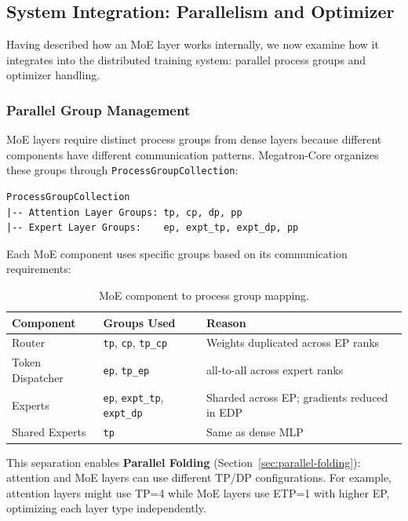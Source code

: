 \subsection{System Integration: Parallelism and Optimizer}\label{sec:moe-system-integration}

Having described how an MoE layer works internally, we now examine how it integrates into the distributed training system: parallel process groups and optimizer handling.

\subsubsection{Parallel Group Management}

MoE layers require distinct process groups from dense layers because different components have different communication patterns. Megatron-Core organizes these groups through \texttt{ProcessGroupCollection}:

\begin{lstlisting}
ProcessGroupCollection
|-- Attention Layer Groups: tp, cp, dp, pp
|-- Expert Layer Groups:    ep, expt_tp, expt_dp, pp
\end{lstlisting}

Each MoE component uses specific groups based on its communication requirements:

\begin{table}[ht]
\centering
\begin{tabular}{lll}
\toprule
\textbf{Component} & \textbf{Groups Used} & \textbf{Reason} \\
\midrule
Router & \texttt{tp}, \texttt{cp}, \texttt{tp\_cp} & Weights duplicated across EP ranks \\
Token Dispatcher & \texttt{ep}, \texttt{tp\_ep} & all-to-all across expert ranks \\
Experts & \texttt{ep}, \texttt{expt\_tp}, \texttt{expt\_dp} & Sharded across EP; gradients reduced in EDP \\
Shared Experts & \texttt{tp} & Same as dense MLP \\
\bottomrule
\end{tabular}
\caption{MoE component to process group mapping.}
\label{tab:moe-process-groups}
\end{table}

This separation enables \textbf{Parallel Folding} (Section~\ref{sec:parallel-folding}): attention and MoE layers can use different TP/DP configurations. For example, attention layers might use TP=4 while MoE layers use ETP=1 with higher EP, optimizing each layer type independently.

